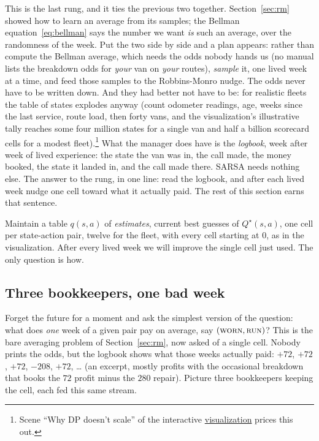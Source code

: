 \documentclass[11pt,a4paper]{article}
\theoremstyle{definition}
\theoremstyle{remark}
\numberwithin{equation}{section}
\newcommand{\sa}[1]{\textsc{#1}}   %
\newcommand{\vizhref}[1]{\href{https://eth-ainit-fs26.github.io/rl-arcade/repair-or-replace/}{#1}}
\begin{document}
This is the last rung, and it ties the previous two together. Section~\ref{sec:rm} showed how
to learn an average from its samples; the Bellman equation~\eqref{eq:bellman} says the number
we want \emph{is} such an average, over the randomness of the week. Put the two side by side and
a plan appears: rather than compute the Bellman average, which needs the odds nobody hands us
(no manual lists the breakdown odds for \emph{your} van on \emph{your} routes), \emph{sample}
it, one lived week at a time, and feed those samples to the Robbins-Monro nudge. The odds never
have to be written down. And they had better not have to be: for realistic fleets the table of
states explodes anyway (count odometer readings, age, weeks since the last service, route load,
then forty vans, and the visualization's illustrative tally reaches some four million states
for a single van and half a billion scorecard cells for a modest fleet).\footnote{Scene ``Why
DP doesn't scale'' of the interactive \vizhref{visualization} prices this out.} What the manager
does have is the \emph{logbook}, week after week of lived experience: the state the van was
in, the call made, the money booked, the state it landed in, and the call made there. SARSA
needs nothing else. The answer to the rung, in one line: read the logbook, and after each
lived week nudge one cell toward what it actually paid. The rest of this section earns that
sentence.

Maintain a table $q(s, a)$ of \emph{estimates}, current best guesses of $Q^\star(s, a)$, one
cell per state-action pair, twelve for the fleet, with every cell starting at $0$, as in the
visualization. After every lived week we will improve the single cell just used. The only
question is how.

\subsection*{Three bookkeepers, one bad week}

Forget the future for a moment and ask the simplest version of the question: what does
\emph{one} week of a given pair pay on average, say $(\sa{worn}, \sa{run})$? This is the bare
averaging problem of Section~\ref{sec:rm}, now asked of a single cell. Nobody prints the odds,
but the logbook shows what those weeks actually paid: $+72$, $+72$, $+72$, $-208$,
$+72$, \dots{} (an excerpt, mostly profits with the occasional breakdown that books the $72$
profit minus the $280$ repair). Picture three bookkeepers keeping the cell, each fed this same
stream.
\end{document}

